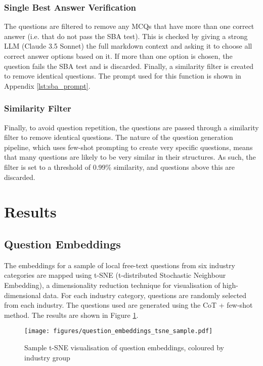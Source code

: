 \subsubsection{Single Best Answer Verification}

The questions are filtered to remove any MCQs that have more than one correct answer (i.e. that do not pass the SBA test). This is checked by giving a strong LLM (Claude 3.5 Sonnet) the full markdown context and asking it to choose all correct answer options based on it. If more than one option is chosen, the question fails the SBA test and is discarded. Finally, a similarity filter is created to remove identical questions. The prompt used for this function is shown in Appendix \ref{lst:sba_prompt}.

\subsubsection{Similarity Filter}

Finally, to avoid question repetition, the questions are passed through a similarity filter to remove identical questions. The nature of the question generation pipeline, which uses few-shot prompting to create very specific questions, means that many questions are likely to be very similar in their structures. As such, the filter is set to a threshold of 0.99\% similarity, and questions above this are discarded.

\section{Results}



\subsection{Question Embeddings}

The embeddings for a sample of local free-text questions from six industry categories are mapped using t-SNE (t-distributed Stochastic Neighbour Embedding), a dimensionality reduction technique for visualisation of high-dimensional data. For each industry category, questions are randomly selected from each industry. The questions used are generated using the CoT + few-shot method. The results are shown in Figure \ref{fig:question_embeddings}.

\begin{figure}[H]
    \centering
    \texttt{[image: figures/question\_embeddings\_tsne\_sample.pdf]}
    \caption{Sample t-SNE visualisation of question embeddings, coloured by industry group}
    \label{fig:question_embeddings}
\end{figure}




